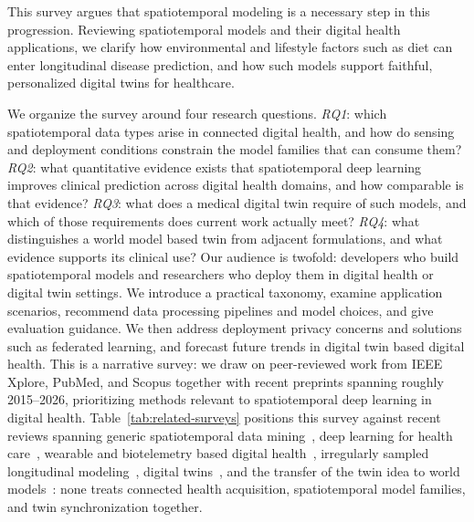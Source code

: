 \documentclass[journal]{IEEEtran}
\begin{document}
This survey argues that spatiotemporal modeling is a necessary step in this progression. Reviewing spatiotemporal models and their digital health applications, we clarify how environmental and lifestyle factors such as diet can enter longitudinal disease prediction, and how such models support faithful, personalized digital twins for healthcare.


We organize the survey around four research questions. \emph{RQ1}: which spatiotemporal data types arise in connected digital health, and how do sensing and deployment conditions constrain the model families that can consume them? \emph{RQ2}: what quantitative evidence exists that spatiotemporal deep learning improves clinical prediction across digital health domains, and how comparable is that evidence? \emph{RQ3}: what does a medical digital twin require of such models, and which of those requirements does current work actually meet? \emph{RQ4}: what distinguishes a world model based twin from adjacent formulations, and what evidence supports its clinical use? Our audience is twofold: developers who build spatiotemporal models and researchers who deploy them in digital health or digital twin settings. We introduce a practical taxonomy, examine application scenarios, recommend data processing pipelines and model choices, and give evaluation guidance. We then address deployment privacy concerns and solutions such as federated learning, and forecast future trends in digital twin based digital health. This is a narrative survey: we draw on peer-reviewed work from IEEE Xplore, PubMed, and Scopus together with recent preprints spanning roughly 2015--2026, prioritizing methods relevant to spatiotemporal deep learning in digital health. Table~\ref{tab:related-surveys} positions this survey against recent reviews spanning generic spatiotemporal data mining~\cite{wang2022deep,atluri2018stdm}, deep learning for health care~\cite{miotto2018deeplearning}, wearable and biotelemetry based digital health~\cite{Busnatu2022}, irregularly sampled longitudinal modeling~\cite{shukla2021irregular}, digital twins~\cite{Wang2023Survey,Sel2025VVUQ}, and the transfer of the twin idea to world models~\cite{Zheng2026DTtoWM}: none treats connected health acquisition, spatiotemporal model families, and twin synchronization together.
\end{document}
